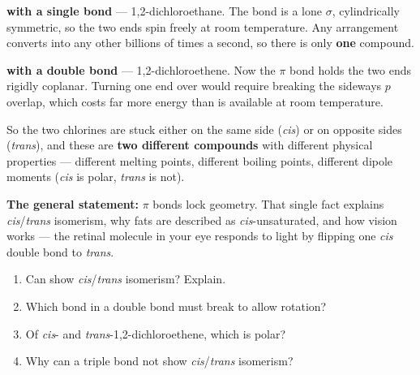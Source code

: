 \documentclass{apchem-worksheet}
\begin{document}
\begin{workedexample}
\textbf{ with a single  bond} ---
1,2-dichloroethane. The  bond is a lone $\sigma$, cylindrically
symmetric, so the two  ends spin freely at room temperature.
Any arrangement converts into any other billions of times a second, so
there is only \textbf{one} compound.

\textbf{ with a double  bond} ---
1,2-dichloroethene. Now the $\pi$ bond holds the two ends rigidly
coplanar. Turning one end over would require breaking the sideways $p$
overlap, which costs far more energy than is available at room
temperature.

So the two chlorines are stuck either on the same side (\emph{cis}) or
on opposite sides (\emph{trans}), and these are \textbf{two different
compounds} with different physical properties --- different melting
points, different boiling points, different dipole moments (\emph{cis}
is polar, \emph{trans} is not).

\textbf{The general statement:} $\pi$ bonds lock geometry. That single
fact explains \emph{cis}/\emph{trans} isomerism, why fats are described
as \emph{cis}-unsaturated, and how vision works --- the retinal molecule
in your eye responds to light by flipping one \emph{cis} double bond to
\emph{trans}.
\end{workedexample}

\begin{yourturn}
\begin{enumerate}[leftmargin=*,itemsep=0.5em]
  \item Can  show \emph{cis}/\emph{trans} isomerism?
        Explain. \workspace[1.6cm]
  \item Which bond in a double bond must break to allow rotation?
        \workspace[1.4cm]
  \item Of \emph{cis}- and \emph{trans}-1,2-dichloroethene, which is
        polar? \workspace[1.6cm]
  \item Why can a triple bond not show \emph{cis}/\emph{trans}
        isomerism? \workspace[1.8cm]
\end{enumerate}
\end{yourturn}
\end{document}

